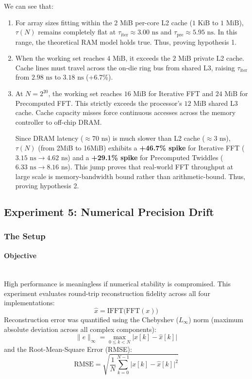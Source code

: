 \documentclass{article}
\begin{document}
We can see that:
\begin{enumerate}
    \item For array sizes fitting within the 2 MiB per-core L2 cache ($1\text{ KiB}$ to $1\text{ MiB}$), $\tau(N)$ remains completely flat at $\tau_{\text{iter}} \approx 3.00\text{ ns}$ and $\tau_{\text{pre}} \approx 5.95\text{ ns}$. In this range, the theoretical RAM model holds true. Thus, proving hypothesis 1. 
    \item When the working set reaches $4\text{ MiB}$, it exceeds the $2\text{ MiB}$ private L2 cache. Cache lines must travel across the on-die ring bus from shared L3, raising $\tau_{\text{iter}}$ from $2.98\text{ ns}$ to $3.18\text{ ns}$ (+6.7\%).
    \item At $N = 2^{20}$, the working set reaches $16\text{ MiB}$ for Iterative FFT and $24\text{ MiB}$ for Precomputed FFT. This strictly exceeds the processor's $12\text{ MiB}$ shared L3 cache. Cache capacity misses force continuous accesses across the memory controller to off-chip DRAM. 
    
    Since DRAM latency ($\approx 70\text{ ns}$) is much slower than L2 cache ($\approx 3\text{ ns}$), $\tau(N)$ (from 2MiB to 16MiB) exhibits a \textbf{+46.7\% spike} for Iterative FFT ($3.15\text{ ns} \to 4.62\text{ ns}$) and a \textbf{+29.1\% spike} for Precomputed Twiddles ($6.33\text{ ns} \to 8.16\text{ ns}$). This jump proves that real-world FFT throughput at large scale is memory-bandwidth bound rather than arithmetic-bound. Thus, proving hypothesis 2.
\end{enumerate}


\subsection{Experiment 5: Numerical Precision Drift} \label{sec:exp5_design}
\subsubsection*{The Setup}
\paragraph{Objective}~{}\\
High performance is meaningless if numerical stability is compromised. This experiment evaluates round-trip reconstruction fidelity across all four implementations:
\begin{equation}
\hat{x} = \text{IFFT}\big(\text{FFT}(x)\big)
\end{equation}
Reconstruction error was quantified using the Chebyshev ($L_\infty$) norm (maximum absolute deviation across all complex components):
\begin{equation} \label{eq:chebyshev}
\|e\|_\infty = \max_{0 \le k < N} \big| x[k] - \hat{x}[k] \big|
\end{equation}
and the Root-Mean-Square Error (RMSE):
\begin{equation}
\text{RMSE} = \sqrt{\frac{1}{N} \sum_{k=0}^{N-1} \big| x[k] - \hat{x}[k] \big|^2}
\end{equation}
\end{document}
